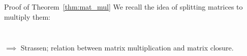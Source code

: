 \begin{frame}{Proof of Theorem~\ref{thm:mat_mul}}
    We recall the idea of splitting matrices to multiply them:

    \begin{columns}
        \begin{column}{.2\linewidth}
            \begin{figure}
            \end{figure}
        \end{column}
        \begin{column}{.2\linewidth}
            \begin{figure}
            \end{figure}
        \end{column}
    \end{columns}

    $\implies$ Strassen; relation between matrix multiplication and matrix closure.
\end{frame}

